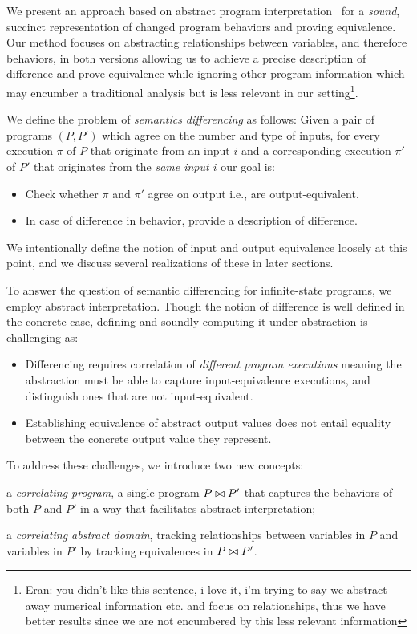 We present an approach based on abstract program interpretation~\cite{CousotCousot77} for a \emph{sound}, succinct representation of changed program behaviors and proving equivalence. Our method focuses on abstracting relationships between variables, and therefore behaviors, in both versions allowing us to achieve a precise description of difference and prove equivalence while ignoring other program information which may encumber a traditional analysis but is less relevant in our setting\footnote[1]{Eran: you didn't like this sentence, i love it, i'm trying to say we abstract away numerical information etc. and focus on relationships, thus we have better results since we are not encumbered by this less relevant information}.

We define the problem of \emph{semantics differencing} as follows: Given a pair of programs $(P,P')$ which agree on the number and type of inputs, for every execution $\pi$ of $P$ that originate from an input $i$ and a corresponding execution $\pi'$ of $P'$ that originates from the \emph{same input $i$} our goal is:
\begin{itemize}
\item Check whether $\pi$ and $\pi'$ agree on output i.e., are output-equivalent. 
\item In case of difference in behavior, provide a description of difference.
\end{itemize}
We intentionally define the notion of input and output equivalence loosely at this point, and we discuss several realizations of these in later sections. 

To answer the question of semantic differencing for infinite-state programs, we employ abstract interpretation. Though the notion of difference is well defined in the concrete case, defining and soundly computing it under abstraction is challenging as:
\begin{itemize}
\item Differencing requires correlation of \emph{different program executions} meaning the abstraction must be able to capture input-equivalence executions, and distinguish ones that are not input-equivalent. 
\item Establishing equivalence of abstract output values does not entail equality between the concrete output value they represent. 
\end{itemize}

To address these challenges, we introduce two new concepts: 
\begin{inparaenum}[(i)]
\item a \emph{correlating program}, a single program $P \bowtie P'$ that captures the behaviors of both $P$ and $P'$ in a way that facilitates abstract interpretation;
\item a \emph{correlating abstract domain}, tracking relationships between variables in $P$ and variables in $P'$ by tracking equivalences in $P \bowtie P'$.
\end{inparaenum}

